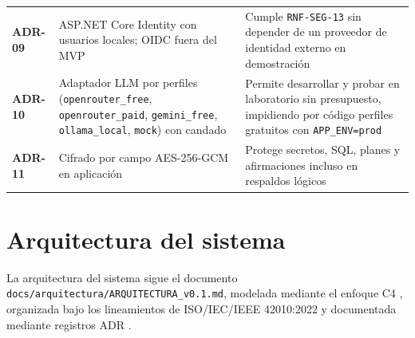 \documentclass[12pt,a4paper]{article}
\begin{document}
\begin{longtable}{>{\bfseries}p{} p{} p{}}
ADR-09 & ASP.NET Core Identity con usuarios locales; OIDC fuera del MVP & Cumple \texttt{RNF-SEG-13} sin depender de un proveedor de identidad externo en demostración \\
ADR-10 & Adaptador LLM por perfiles (\texttt{openrouter\_free}, \texttt{openrouter\_paid}, \texttt{gemini\_free}, \texttt{ollama\_local}, \texttt{mock}) con candado & Permite desarrollar y probar en laboratorio sin presupuesto, impidiendo por código perfiles gratuitos con \texttt{APP\_ENV=prod} \\
ADR-11 & Cifrado por campo AES-256-GCM en aplicación & Protege secretos, SQL, planes y afirmaciones incluso en respaldos lógicos \\
\end{longtable}
\endgroup

\section{Arquitectura del sistema}

La arquitectura del sistema sigue el documento \texttt{docs/arquitectura/ARQUITECTURA\_v0.1.md}, modelada mediante el enfoque C4 \cite{brown-c4}, organizada bajo los lineamientos de ISO/IEC/IEEE 42010:2022 \cite{iso-42010} y documentada mediante registros ADR \cite{nygard-adr}.
\end{document}
